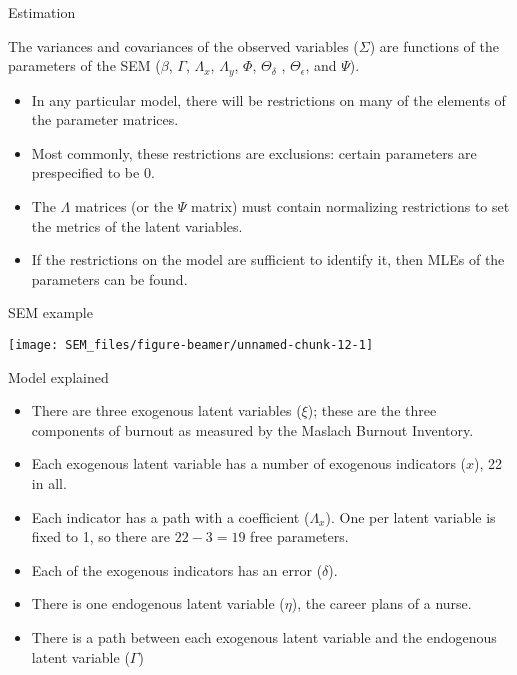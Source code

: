 \documentclass[10pt,ignorenonframetext,]{beamer}
\providecommand{\tightlist}{%
\setlength{\itemsep}{0pt}\setlength{\parskip}{0pt}}
\begin{document}
\begin{frame}{Estimation}

The variances and covariances of the observed variables (\(\Sigma\)) are
functions of the parameters of the SEM (\(\beta\), \(\Gamma\),
\(\Lambda_x\), \(\Lambda_y\), \(\Phi\), \(\Theta_\delta\) ,
\(\Theta_\epsilon\), and \(\Psi\)).

\begin{itemize}
\tightlist
\item
  In any particular model, there will be restrictions on many of the
  elements of the parameter matrices.
\item
  Most commonly, these restrictions are exclusions: certain parameters
  are prespecified to be 0.
\item
  The \(\Lambda\) matrices (or the \(\Psi\) matrix) must contain
  normalizing restrictions to set the metrics of the latent variables.
\item
  If the restrictions on the model are sufficient to identify it, then
  MLEs of the parameters can be found.
\end{itemize}

\end{frame}

\begin{frame}{SEM example}

\begin{center}\texttt{[image: SEM\_files/figure-beamer/unnamed-chunk-12-1]} \end{center}

\end{frame}

\begin{frame}{Model explained}

\begin{itemize}
\tightlist
\item
  There are three exogenous latent variables (\(\xi\)); these are the
  three components of burnout as measured by the Maslach Burnout
  Inventory.
\item
  Each exogenous latent variable has a number of exogenous indicators
  (\(x\)), 22 in all.
\item
  Each indicator has a path with a coefficient (\(\Lambda_x\)). One per
  latent variable is fixed to 1, so there are \(22 - 3 = 19\) free
  parameters.
\item
  Each of the exogenous indicators has an error (\(\delta\)).
\item
  There is one endogenous latent variable (\(\eta\)), the career plans
  of a nurse.
\item
  There is a path between each exogenous latent variable and the
  endogenous latent variable (\(\Gamma\))
\end{itemize}

\end{frame}
\end{document}
